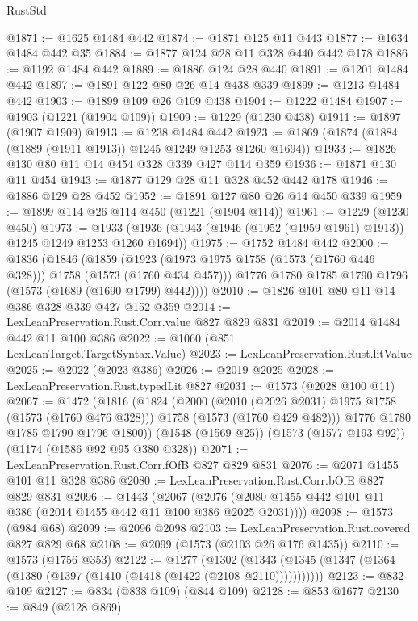 \begin{lexlean}{RustStd}
\begin{coremodule}
@1871 := @1625 @1484 @442
@1874 := @1871 @125 @11 @443
@1877 := @1634 @1484 @442 @35
@1884 := @1877 @124 @28 @11 @328 @440 @442 @178
@1886 := @1192 @1484 @442
@1889 := @1886 @124 @28 @440
@1891 := @1201 @1484 @442
@1897 := @1891 @122 @80 @26 @14 @438 @339
@1899 := @1213 @1484 @442
@1903 := @1899 @109 @26 @109 @438
@1904 := @1222 @1484
@1907 := @1903 (@1221 (@1904 @109))
@1909 := @1229 (@1230 @438)
@1911 := @1897 (@1907 @1909)
@1913 := @1238 @1484 @442
@1923 := @1869 (@1874 (@1884 (@1889 (@1911 @1913)) @1245 @1249 @1253 @1260 @1694))
@1933 := @1826 @130 @80 @11 @14 @454 @328 @339 @427 @114 @359
@1936 := @1871 @130 @11 @454
@1943 := @1877 @129 @28 @11 @328 @452 @442 @178
@1946 := @1886 @129 @28 @452
@1952 := @1891 @127 @80 @26 @14 @450 @339
@1959 := @1899 @114 @26 @114 @450 (@1221 (@1904 @114))
@1961 := @1229 (@1230 @450)
@1973 := @1933 (@1936 (@1943 (@1946 (@1952 (@1959 @1961) @1913)) @1245 @1249 @1253 @1260 @1694))
@1975 := @1752 @1484 @442
@2000 := @1836
    (@1846
      (@1859
        (@1923 (@1973 @1975 @1758 (@1573 (@1760 @446 @328))) @1758 (@1573 (@1760 @434 @457)))
        @1776
        @1780
        @1785
        @1790
        @1796
        (@1573 (@1689 (@1690 @1799) @442))))
@2010 := @1826 @101 @80 @11 @14 @386 @328 @339 @427 @152 @359
@2014 := LexLeanPreservation.Rust.Corr.value @827 @829 @831
@2019 := @2014 @1484 @442 @11 @100 @386
@2022 := @1060 (@851 LexLeanTarget.TargetSyntax.Value)
@2023 := LexLeanPreservation.Rust.litValue
@2025 := @2022 (@2023 @386)
@2026 := @2019 @2025
@2028 := LexLeanPreservation.Rust.typedLit @827
@2031 := @1573 (@2028 @100 @11)
@2067 := @1472
    (@1816
      (@1824
        (@2000
          (@2010 (@2026 @2031) @1975 @1758 (@1573 (@1760 @476 @328)))
          @1758
          (@1573 (@1760 @429 @482)))
        @1776
        @1780
        @1785
        @1790
        @1796
        @1800))
    (@1548 (@1569 @25))
    (@1573 (@1577 @193 @92))
    (@1174 (@1586 @92 @95 @380 @328))
@2071 := LexLeanPreservation.Rust.Corr.fOfB @827 @829 @831
@2076 := @2071 @1455 @101 @11 @328 @386
@2080 := LexLeanPreservation.Rust.Corr.bOfE @827 @829 @831
@2096 := @1443
    (@2067 (@2076 (@2080 @1455 @442 @101 @11 @386 (@2014 @1455 @442 @11 @100 @386 @2025 @2031))))
@2098 := @1573 (@984 @68)
@2099 := @2096 @2098
@2103 := LexLeanPreservation.Rust.covered @827 @829 @68
@2108 := @2099 (@1573 (@2103 @26 @176 @1435))
@2110 := @1573 (@1756 @353)
@2122 := @1277
    (@1302 (@1343 (@1345 (@1347 (@1364 (@1380 (@1397 (@1410 (@1418 (@1422 (@2108 @2110)))))))))))
@2123 := @832 @109
@2127 := @834 (@838 @109) (@844 @109)
@2128 := @853 @1677
@2130 := @849 (@2128 @869)

\end{coremodule}
\end{lexlean}
